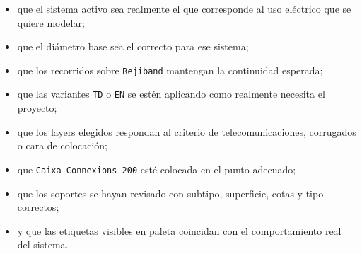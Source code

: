\begin{itemize}
\item que el sistema activo sea realmente el que corresponde al uso eléctrico que se quiere modelar;
\item que el diámetro base sea el correcto para ese sistema;
\item que los recorridos sobre \texttt{Rejiband} mantengan la continuidad esperada;
\item que las variantes \texttt{TD} o \texttt{EN} se estén aplicando como realmente necesita el proyecto;
\item que los layers elegidos respondan al criterio de telecomunicaciones, corrugados o cara de colocación;
\item que \texttt{Caixa Connexions 200} esté colocada en el punto adecuado;
\item que los soportes se hayan revisado con subtipo, superficie, cotas y tipo correctos;
\item y que las etiquetas visibles en paleta coincidan con el comportamiento real del sistema.
\end{itemize}

